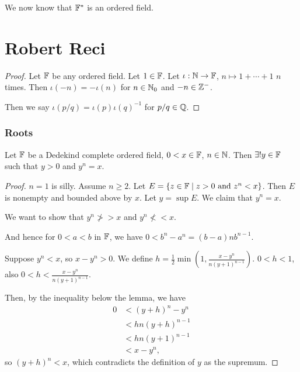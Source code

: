 \documentclass{report}
\begin{document}
We now know that $\FF^*$ is an ordered field.


\section{Robert Reci}

\begin{proof}
    Let $\FF$ be any ordered field. Let $1 \in \FF$. Let $\iota : \NN \to \FF$, $n \mapsto 1 + \cdots + 1$ $n$ times. Then $\iota(-n) = -\iota(n)$ for $n \in \NN_0$ and $-n \in \ZZ^-$. 

    Then we say $\iota(p/q) = \iota(p)\iota(q)^{-1}$ for $p/q \in \QQ$.
\end{proof}


\subsubsection{Roots}
Let $\FF$ be a Dedekind complete ordered field, $0 < x \in \FF$, $n \in \NN$. Then $\exists ! y \in \FF$ such that $y > 0$ and $y^n = x$.

\begin{proof}
    $n = 1$ is silly. Assume $n \geq 2$. Let $E = \{ z \in \FF \mid z > 0 \text{ and } z^n < x\}$. Then $E$ is nonempty and bounded above by $x$. Let $y = \sup E$. We claim that $y^n = x$.

    We want to show that $y^n \ngtr > x$ and $y^n \nless < x$. 


    And hence for $0 < a < b$ in $\FF$, we have $0 < b^n - a^n = (b-a)nb^{n-1}$. 

    Suppose $y^n < x$, so $x-y^n > 0$. We define $h = \frac 12 \min\left(1, \frac{x-y^n}{n(y+1)^{n-1}}\right)$. $0 < h < 1$, also $0 < h < \frac{x-y^n}{n(y+1)^{n-1}}$. 

    Then, by the inequality below the lemma, we have \begin{align*}
        0 &< (y+h)^n - y^n \\
        &< hn(y + h)^{n-1} \\
        &< hn(y + 1)^{n-1} \\
        &< {x-y^n},
    \end{align*}
    so $(y+h)^n < x$, which contradicts the definition of $y$ as the supremum.
\end{proof}
\end{document}
